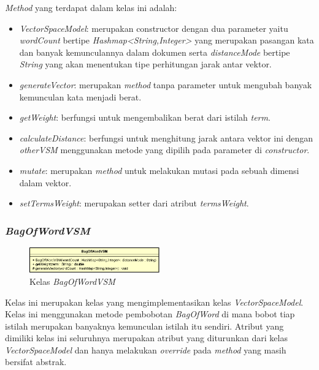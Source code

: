 \documentclass[a4paper,twoside]{article}
\begin{document}
\begin{enumerate}
\textit{Method} yang terdapat dalam kelas ini adalah:

\begin{itemize}
	\item \textit{VectorSpaceModel}: merupakan constructor dengan dua parameter yaitu \textit{wordCount} bertipe \textit{Hashmap<String,Integer>} yang merupakan pasangan kata dan banyak kemunculannya dalam dokumen serta \textit{distanceMode} bertipe \textit{String} yang akan menentukan tipe perhitungan jarak antar vektor.
	\item \textit{generateVector}: merupakan \textit{method} tanpa parameter untuk mengubah banyak kemunculan kata menjadi berat.
	\item \textit{getWeight}: berfungsi untuk mengembalikan berat dari istilah \textit{term}.
	\item \textit{calculateDistance}: berfungsi untuk menghitung jarak antara vektor ini dengan \textit{otherVSM} menggunakan metode yang dipilih pada parameter di \textit{constructor}.
	\item \textit{mutate}: merupakan \textit{method} untuk melakukan mutasi pada sebuah dimensi dalam vektor.
	\item \textit{setTermsWeight}: merupakan setter dari atribut \textit{termsWeight}.
\end{itemize}

\subsubsection*{\textit{BagOfWordVSM}}

\begin{figure}[h]
	\begin{center}
		\includegraphics[width=0.5\textwidth]{DiagramKelas/BagOfWordVSM}
		\caption{Kelas \textit{BagOfWordVSM}}
		\label{fig:kelasBagOfWordVSM}
	\end{center}
\end{figure}

Kelas ini merupakan kelas yang mengimplementasikan kelas \textit{VectorSpaceModel}. Kelas ini menggunakan metode pembobotan \textit{BagOfWord} di mana bobot tiap istilah merupakan banyaknya kemunculan istilah itu sendiri. Atribut yang dimiliki kelas ini seluruhnya merupakan atribut yang diturunkan dari kelas \textit{VectorSpaceModel} dan hanya melakukan \textit{override} pada \textit{method} yang masih bersifat abstrak.


\end{enumerate}
\end{document}
